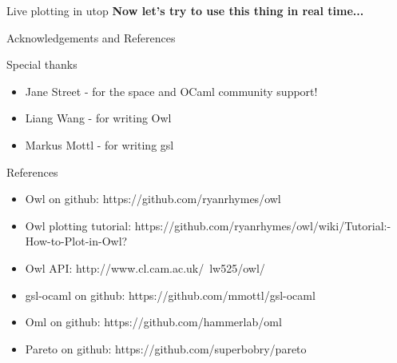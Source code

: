 \documentclass{beamer}
\begin{document}
\begin{frame}{Live plotting in utop}
\textbf{Now let's try to use this thing in real time...}
\end{frame}
\begin{frame}{Acknowledgements and References}

\begin{block}{Special thanks}
\begin{itemize}
\item Jane Street - for the space and OCaml community support!
\item Liang Wang - for writing Owl
\item Markus Mottl - for writing gsl
\end{itemize}
\end{block}
\begin{block}{References}
\begin{itemize}
\item Owl on github: https://github.com/ryanrhymes/owl
\item Owl plotting tutorial: https://github.com/ryanrhymes/owl/wiki/Tutorial:-How-to-Plot-in-Owl?
\item Owl API: http://www.cl.cam.ac.uk/~lw525/owl/
\item gsl-ocaml on github: https://github.com/mmottl/gsl-ocaml
\item Oml on github: https://github.com/hammerlab/oml
\item Pareto on github: https://github.com/superbobry/pareto
\end{itemize}
\end{block}
\end{frame}
\end{document}
